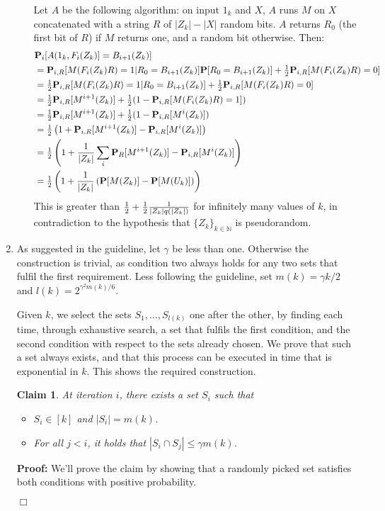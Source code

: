 \documentclass[11pt]{article} \usepackage{amssymb}
\newtheorem{claim}[theorem]{Claim}
\newenvironment{proof}{\noindent \textbf{Proof:}}{$\Box$}
\newcommand{\N}{\mathbb N} \newcommand{\R}{\mathbb R}
\newcommand{\half}{{\textstyle \frac12}}
\begin{document}
\begin{enumerate}
\begin{itemize}
    Let $A$ be the following algorithm: on input $1_k$ and $X$,
    $A$ runs $M$ on $X$ concatenated with a string $R$ of
    $|Z_k|-|X|$ random bits. $A$ returns $R_0$ (the first bit of $R$) if 
    $M$ returns one, and a random bit otherwise. Then:
    \begin{align*}
      \lefteqn{\P_i[A(1_k,F_i(Z_k)]=B_{i+1}(Z_k)]} 
      \\ &= \P_{i,R}[M(F_i(Z_k)R)=1|R_0=B_{i+1}(Z_k)]\P[R_0=B_{i+1}(Z_k)] + \half\P_{i,R}[M(F_i(Z_k)R)=0]
      \\ &= \half\P_{i,R}[M(F_i(Z_k)R)=1|R_0=B_{i+1}(Z_k)] + \half\P_{i,R}[M(F_i(Z_k)R)=0]
      \\ &= \half\P_{i,R}[M^{i+1}(Z_k)] + \half(1-\P_{i,R}[M(F_i(Z_k)R)=1])
      \\ &= \half\P_{i,R}[M^{i+1}(Z_k)] + \half(1-\P_{i,R}[M^i(Z_k)])
      \\ &= \half \left(1+ \P_{i,R}[M^{i+1}(Z_k)] -\P_{i,R}[M^i(Z_k)]\right)
      \\ &= \half \left(1+ {1\over |Z_k|}\sum_i\P_{R}[M^{i+1}(Z_k)] -\P_{i,R}[M^i(Z_k)]\right)
      \\ &= \half \left(1+ {1\over |Z_k|}\left(\P[M(Z_k)] -\P[M(U_k)]\right)\right)
    \end{align*}
    This is greater than $\half+\half{1\over |Z_k|q(|Z_k|)}$ for infinitely
    many values of $k$, in contradiction to the hypothesis that 
    $\{Z_k\}_{k\in\N}$ is pseudorandom.
   
    
  \end{itemize}

\item
  
  As suggested in the guideline, let $\gamma$ be less than one. Otherwise the
  construction is trivial, as condition two always holds for any two sets that
  fulfil the first requirement. Less following the guideline, set 
  $m(k)=\gamma k/2$ and $l(k)=2^{\gamma^2 m(k)/6}$. 
  
  Given $k$, we select the sets $S_1,\ldots,S_{l(k)}$ one
  after the other, by finding each time, through exhaustive search, a set
  that fulfils the first condition, and the second condition with respect to the 
  sets already chosen. We prove that such a set always exists, and that
  this process can be executed in time that is exponential in $k$. This shows
  the required construction.
  
  \begin{claim}
    At iteration $i$, there exists a set $S_i$ such that
    \begin{itemize}
    \item $S_i\in [k]$ and $|S_i|=m(k)$.
    \item For all $j<i$, it holds that $|S_i\cap S_j|\leq \gamma m(k)$.
    \end{itemize}
  \end{claim}
  \begin{proof}
    We'll prove the claim by showing that a randomly picked set satisfies both
    conditions with positive probability.
    

\end{proof}
\end{enumerate}
\end{document}
